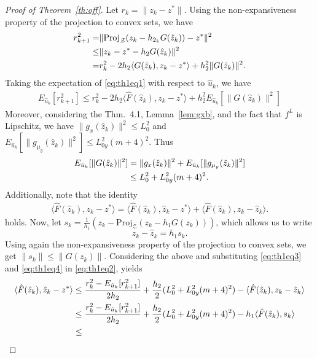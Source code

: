 \documentclass{article}
\theoremstyle{plain}
\theoremstyle{definition}
\theoremstyle{remark}
\begin{document}
\begin{proof}[Proof of Theorem~\ref{th:off}]
    Let $r_k = \|z_k-z^\ast\|.$ Using the non-expansiveness property of the projection to convex sets, we have
    \begin{align}\label{eq:th1eq1}
        r_{k+1}^2=&\|\mathrm{Proj}_{\mathcal{Z}}(z_k - h_{2_k}G(\hat{z}_k))-z^\ast\|^2\notag\\\leq&\|z_k-z^\ast-h_2G(\hat{z}_k)\|^2\notag\\=&r_k^2-2h_2\langle G(\hat{z}_k),z_k-z^\ast\rangle+h_2^2\|G(\hat{z}_k)\|^2.
    \end{align}
    Taking the expectation of 
    \eqref{eq:th1eq1} with respect to $\hat{u}_k$, we have
    \begin{align}\label{eq:th1eq2}
    E_{\hat{u}_k}[r_{k+1}^2]\leq  r_k^2-2h_2\langle \hat{F}(\hat{z}_k),z_k-z^\ast\rangle+h_2^2E_{\hat{u}_k}[\|G(\hat{z}_k)\|^2]
    \end{align}
Moreover, considering the \cite{nesterov_random_2017} Thm.~4.1, Lemma~\ref{lem:gxb}, and the fact that
$f^L$ is Lipschitz, we have $\|g_x(\hat{z}_k)\|^2\leq L_0^2$ and $E_{\hat{u}_k}[\|g_{\mu_y}(\hat{z}_k)\|^2]\leq L_{0y}^2(m+4)^2.$ Thus
\begin{align}\label{eq:th1eq3}
    E_{\hat{u}_k}[\|G(\hat{z}_k)\|^2] &=  \|g_x(\hat{z}_k)\|^2+E_{\hat{u}_k}[\|g_{\mu_y}(\hat{z}_k)\|^2]\notag\\
    &\leq L_0^2 + L_{0y}^2(m+4)^2.
    \end{align}
Additionally, note that the identity
    \begin{align}\label{eq:th1eq4}
        \langle \hat{F}(\hat{z}_k),z_k-z^\ast\rangle = \langle \hat{F}(\hat{z}_k),\hat{z}_k-z^\ast\rangle+\langle \hat{F}(\hat{z}_k),z_k-\hat{z}_k\rangle.
    \end{align}
holds.
Now, let $s_k=\frac{1}{h_1}(z_k-\mathrm{Proj}_{\mathcal{Z}}(z_k - h_{1}G(z_k)))$, which allows us to %
write 
$$z_k-\hat{z}_k=h_1s_k.$$ 
Using again the non-expansiveness property of the projection to convex sets, we get $\|s_k\|\leq\|G(z_k)\|.$ 
Considering the above and substituting \eqref{eq:th1eq3} and \eqref{eq:th1eq4} in \eqref{eq:th1eq2}, yields
\begin{align}\label{eq:th1eq5}
    \langle \hat{F}(\hat{z}_k),\hat{z}_k-z^\ast\rangle &\leq  \frac{r_k^2-E_{\hat{u}_k}[r_{k+1}^2]}{2h_2}+\frac{h_2}{2}( L_0^2  +  L_{0y}^2(m+4)^2)-\langle \hat{F}(\hat{z}_k),z_k-\hat{z}_k\rangle\notag\\& \leq
    \frac{r_k^2-E_{\hat{u}_k}[r_{k+1}^2]}{2h_2}+\frac{h_2}{2}( L_0^2  +  L_{0y}^2(m+4)^2)-h_1\langle \hat{F}(\hat{z}_k),s_k\rangle\notag\\& \leq

\end{align}
\end{proof}
\end{document}
